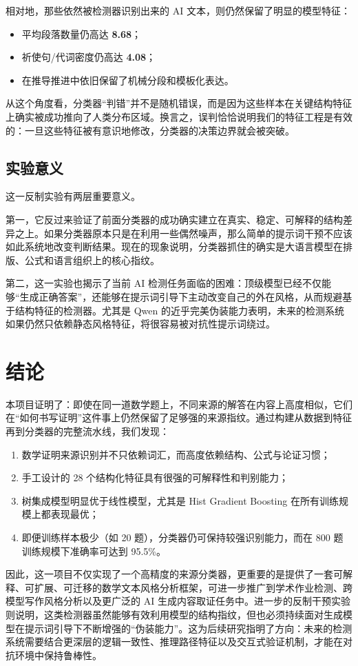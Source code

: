 \documentclass[11pt, a4paper]{ctexart}
\begin{document}
相对地，那些依然被检测器识别出来的 AI 文本，则仍然保留了明显的模型特征：
\begin{itemize}
    \item 平均段落数量仍高达 \textbf{8.68}；
    \item 祈使句/代词密度仍高达 \textbf{4.08}；
    \item 在推导推进中依旧保留了机械分段和模板化表达。
\end{itemize}

从这个角度看，分类器“判错”并不是随机错误，而是因为这些样本在关键结构特征上确实被成功推向了人类分布区域。换言之，误判恰恰说明我们的特征工程是有效的：一旦这些特征被有意识地修改，分类器的决策边界就会被突破。

\subsection{实验意义}
这一反制实验有两层重要意义。

第一，它反过来验证了前面分类器的成功确实建立在真实、稳定、可解释的结构差异之上。如果分类器原本只是在利用一些偶然噪声，那么简单的提示词干预不应该如此系统地改变判断结果。现在的现象说明，分类器抓住的确实是大语言模型在排版、公式和语言组织上的核心指纹。

第二，这一实验也揭示了当前 AI 检测任务面临的困难：顶级模型已经不仅能够“生成正确答案”，还能够在提示词引导下主动改变自己的外在风格，从而规避基于结构特征的检测器。尤其是 Qwen 的近乎完美伪装能力表明，未来的检测系统如果仍然只依赖静态风格特征，将很容易被对抗性提示词绕过。

\section{结论}
本项目证明了：即使在同一道数学题上，不同来源的解答在内容上高度相似，它们在“如何书写证明”这件事上仍然保留了足够强的来源指纹。通过构建从数据到特征再到分类器的完整流水线，我们发现：
\begin{enumerate}
    \item 数学证明来源识别并不只依赖词汇，而高度依赖结构、公式与论证习惯；
    \item 手工设计的 28 个结构化特征具有很强的可解释性和判别能力；
    \item 树集成模型明显优于线性模型，尤其是 Hist Gradient Boosting 在所有训练规模上都表现最优；
    \item 即便训练样本极少（如 20 题），分类器仍可保持较强识别能力，而在 800 题训练规模下准确率可达到 95.5\%。
\end{enumerate}

因此，这一项目不仅实现了一个高精度的来源分类器，更重要的是提供了一套可解释、可扩展、可迁移的数学文本风格分析框架，可进一步推广到学术作业检测、跨模型写作风格分析以及更广泛的 AI 生成内容取证任务中。进一步的反制干预实验则说明，这类检测器虽然能够有效利用模型的结构指纹，但也必须持续面对生成模型在提示词引导下不断增强的“伪装能力”。这为后续研究指明了方向：未来的检测系统需要结合更深层的逻辑一致性、推理路径特征以及交互式验证机制，才能在对抗环境中保持鲁棒性。
\end{document}
